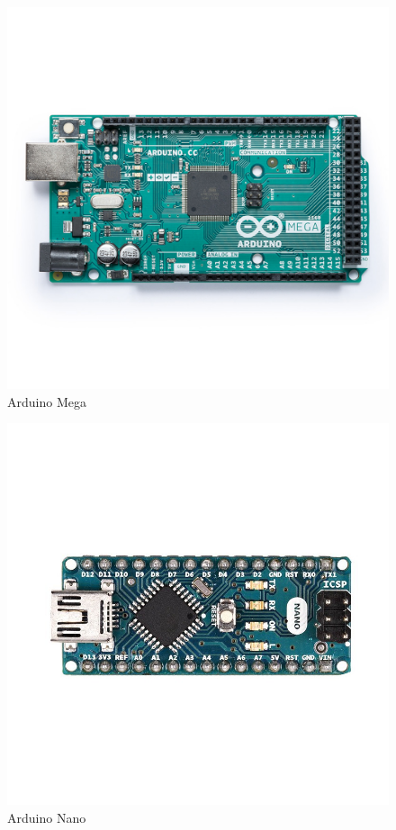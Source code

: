 \documentclass[12pt]{beamer}
\begin{document}
\begin{frame}[allowframebreaks]
    \framebreak%
    \begin{figure}
        \centering
        \includegraphics[height=.68\textheight]{arduino_mega}
        \caption{Arduino Mega}
    \end{figure}

    \framebreak%
    \begin{figure}
        \centering
        \includegraphics[height=.68\textheight]{arduino_nano}
        \caption{Arduino Nano}
    \end{figure}
\end{frame}
\end{document}
